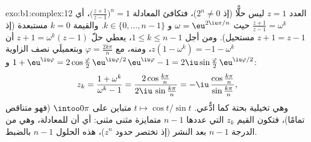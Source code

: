 \begin{solution}{exo:b1:complex:12}
العدد $z = 1$ ليس حلًّا (إذ $2^n \neq 0$)، فتكافئ المعادلة
$\bigl(\frac{z+1}{z-1}\bigr)^n = 1$، أي
$\frac{z+1}{z-1} = \omega^k$ حيث $\omega = \eu^{2\iu\pi/n}$ و
$k \in \{0, \dots, n-1\}$. والقيمة $k = 0$ مستبعدة (إذ $z + 1 =
z - 1$ مستحيل). ومن أجل $1 \leq k \leq n - 1$، يعطي حلّ
$z + 1 = \omega^k(z - 1)$ أن $z(1 - \omega^k) = -1 - \omega^k$،
ومنه، مع $\varphi = \frac{2k\pi}{n}$ وبتعميلَي نصف
الزاوية $1 + \eu^{\iu\varphi} = 2\cos\frac\varphi2\,
\eu^{\iu\varphi/2}$ و$\eu^{\iu\varphi} - 1 = 2\iu\sin\frac\varphi2
\,\eu^{\iu\varphi/2}$:
\[
z_k = \frac{1 + \omega^k}{\omega^k - 1}
= \frac{2\cos\frac{k\pi}{n}}{2\iu\,\sin\frac{k\pi}{n}}
= -\iu\,\frac{\cos\frac{k\pi}{n}}{\sin\frac{k\pi}{n}} ,
\]
وهي تخيلية بحتة كما ادُّعي.  $t \mapsto \cos t/\sin t$
متباين على $\intoo0\pi$ (فهو متناقص تمامًا)، فتكون القيم
$z_k$ التي عددها $n - 1$ متمايزة مثنى مثنى: أي أن للمعادلة، وهي من الدرجة
$n - 1$ بعد النشر (إذ تختصر حدود $z^n$)، هذه الحلول
$n - 1$ بالضبط.
\end{solution}


